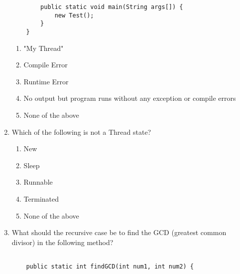 \documentclass[S17-Final.tex]{subfiles}
\begin{document}
\begin{enumerate}
\begin{lstlisting}
        public static void main(String args[]) {
            new Test();
        }
    }
\end{lstlisting}
	
\begin{enumerate}
\item  "My Thread" \ifdraft \Ans \fi 
\item  Compile Error
\item  Runtime Error
\item  No output but program runs without any exception or compile errors
\item  None of the above
\end{enumerate}
\clearpage
\item Which of the following is not a Thread state?
	
\begin{enumerate}
\item  New
\item  Sleep \ifdraft \Ans \fi 
\item  Runnable
\item  Terminated
\item  None of the above
\end{enumerate}

%    
	

\item What should the recursive case be to find the GCD (greatest common divisor) in the following method?
\begin{lstlisting}

    public static int findGCD(int num1, int num2) {
    

\end{lstlisting}
\end{enumerate}
\end{document}

